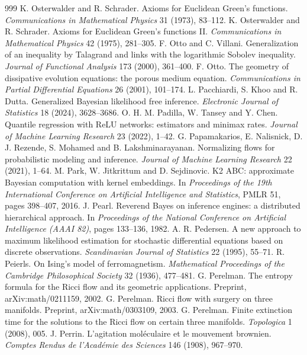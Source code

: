 \begin{thebibliography}{999}
 K. Osterwalder and R. Schrader. Axioms for Euclidean Green's functions. \emph{Communications in Mathematical Physics} 31 (1973), 83--112.
 K. Osterwalder and R. Schrader. Axioms for Euclidean Green's functions II. \emph{Communications in Mathematical Physics} 42 (1975), 281--305.
 F. Otto and C. Villani. Generalization of an inequality by Talagrand and links with the logarithmic Sobolev inequality. \emph{Journal of Functional Analysis} 173 (2000), 361--400.
 F. Otto. The geometry of dissipative evolution equations: the porous medium equation. \emph{Communications in Partial Differential Equations} 26 (2001), 101--174.
 L. Pacchiardi, S. Khoo and R. Dutta. Generalized Bayesian likelihood free inference. \emph{Electronic Journal of Statistics} 18 (2024), 3628--3686.
 O. H. M. Padilla, W. Tansey and Y. Chen. Quantile regression with ReLU networks: estimators and minimax rates. \emph{Journal of Machine Learning Research} 23 (2022), 1--42.
 G. Papamakarios, E. Nalisnick, D. J. Rezende, S. Mohamed and B. Lakshminarayanan. Normalizing flows for probabilistic modeling and inference. \emph{Journal of Machine Learning Research} 22 (2021), 1--64.
 M. Park, W. Jitkrittum and D. Sejdinovic. K2 ABC: approximate Bayesian computation with kernel embeddings. In \emph{Proceedings of the 19th International Conference on Artificial Intelligence and Statistics}, PMLR 51, pages 398--407, 2016.
 J. Pearl. Reverend Bayes on inference engines: a distributed hierarchical approach. In \emph{Proceedings of the National Conference on Artificial Intelligence (AAAI 82)}, pages 133--136, 1982.
 A. R. Pedersen. A new approach to maximum likelihood estimation for stochastic differential equations based on discrete observations. \emph{Scandinavian Journal of Statistics} 22 (1995), 55--71.
 R. Peierls. On Ising's model of ferromagnetism. \emph{Mathematical Proceedings of the Cambridge Philosophical Society} 32 (1936), 477--481.
 G. Perelman. The entropy formula for the Ricci flow and its geometric applications. Preprint, arXiv:math/0211159, 2002.
 G. Perelman. Ricci flow with surgery on three manifolds. Preprint, arXiv:math/0303109, 2003.
 G. Perelman. Finite extinction time for the solutions to the Ricci flow on certain three manifolds. \emph{Topologica} 1 (2008), 005.
 J. Perrin. L'agitation mol\'eculaire et le mouvement brownien. \emph{Comptes Rendus de l'Acad\'emie des Sciences} 146 (1908), 967--970.

\end{thebibliography}
